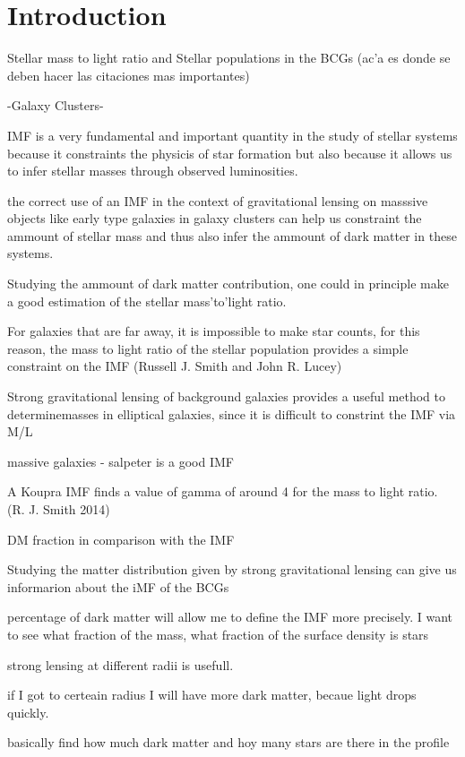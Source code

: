 \chapter{Introduction}

Stellar mass to light ratio and Stellar populations in the BCGs (ac'a es donde se deben hacer las citaciones mas importantes)

-Galaxy Clusters-

IMF is a very fundamental and important quantity in the study of stellar systems because it constraints the physicis of star formation but also because it allows us to infer stellar masses through observed luminosities.

the correct use of an IMF in the context of gravitational lensing on masssive objects like early type galaxies in galaxy clusters can help us constraint the ammount of stellar mass and thus also infer the ammount of dark matter in these systems.

Studying the ammount of dark matter contribution, one could in principle make a good estimation of the stellar mass'to'light ratio.

For galaxies that are far away, it is impossible to make star counts, for this reason, the mass to light ratio of the stellar population provides a simple constraint on the IMF (Russell J. Smith and John R. Lucey) 

Strong gravitational lensing of background galaxies provides a useful method to determinemasses in elliptical galaxies, since it is difficult to constrint the IMF via M/L

massive galaxies - salpeter is a good IMF

A Koupra IMF finds a value of gamma of around 4 for the mass to light ratio. (R. J. Smith 2014) 

DM fraction in comparison with the IMF 

Studying the matter distribution given by strong gravitational lensing can give us informarion about the iMF of the BCGs

percentage of dark matter will allow me to define the IMF more precisely. I want to see what fraction of the mass, what fraction of the surface density is stars

strong lensing at different radii is usefull.

if I got to certeain radius I will have more dark matter, becaue light drops quickly. 

basically find how much dark matter and hoy many stars are there in the profile


\newpage
